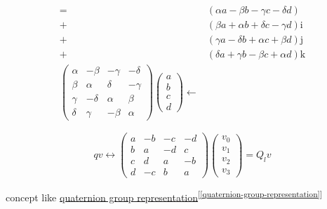 \documentclass[
]{book}
\theoremstyle{definition}
\theoremstyle{definition}
\theoremstyle{definition}
\theoremstyle{definition}
\theoremstyle{remark}
\begin{document}
\[\begin{aligned}
= & \left(\alpha a-\beta b-\gamma c-\delta d\right)\\
+ & \left(\beta a+\alpha b+\delta c-\gamma d\right)\mathrm{i}\\
+ & \left(\gamma a-\delta b+\alpha c+\beta d\right)\mathrm{j}\\
+ & \left(\delta a+\gamma b-\beta c+\alpha d\right)\mathrm{k}\\
\begin{pmatrix}\alpha & -\beta & -\gamma & -\delta\\
\beta & \alpha & \delta & -\gamma\\
\gamma & -\delta & \alpha & \beta\\
\delta & \gamma & -\beta & \alpha
\end{pmatrix}\begin{pmatrix}a\\
b\\
c\\
d
\end{pmatrix}\leftarrow
\end{aligned}
\]

\[
qv\leftrightarrow\begin{pmatrix}a & -b & -c & -d\\
b & a & -d & c\\
c & d & a & -b\\
d & -c & b & a
\end{pmatrix}\begin{pmatrix}v_{{\scriptscriptstyle 0}}\\
v_{{\scriptscriptstyle 1}}\\
v_{{\scriptscriptstyle 2}}\\
v_{{\scriptscriptstyle 3}}
\end{pmatrix}=Q_{{\scriptscriptstyle l}}v
\]

concept like \hyperref[quaternion-group-representation]{quaternion group representation}\textsuperscript{{[}\ref{quaternion-group-representation}{]}}
\end{document}
